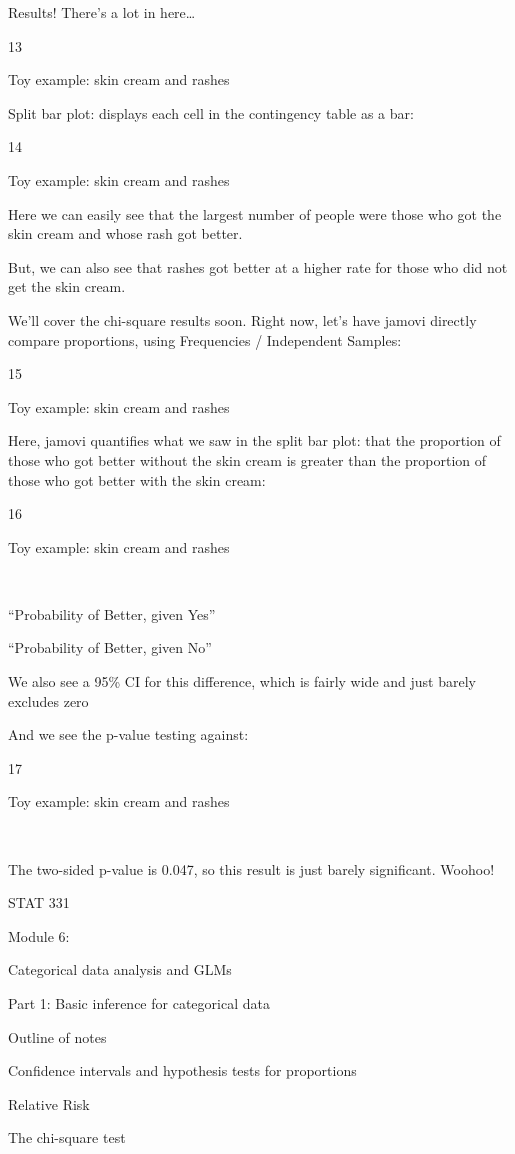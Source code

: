 \documentclass[
  letterpaper,
  DIV=11,
  numbers=noendperiod]{scrreprt}
\begin{document}
Results! There's a lot in here\ldots{}

13

Toy example: skin cream and rashes

Split bar plot: displays each cell in the contingency table as a bar:

14

Toy example: skin cream and rashes

Here we can easily see that the largest number of people were those who
got the skin cream and whose rash got better.

But, we can also see that rashes got better at a higher rate for those
who did not get the skin cream.

We'll cover the chi-square results soon. Right now, let's have jamovi
directly compare proportions, using Frequencies / Independent Samples:

15

Toy example: skin cream and rashes

Here, jamovi quantifies what we saw in the split bar plot: that the
proportion of those who got better without the skin cream is greater
than the proportion of those who got better with the skin cream:

16

Toy example: skin cream and rashes

~

``Probability of Better, given Yes''

``Probability of Better, given No''

We also see a 95\% CI for this difference, which is fairly wide and just
barely excludes zero

And we see the p-value testing against:

17

Toy example: skin cream and rashes

~

The two-sided p-value is 0.047, so this result is just barely
significant. Woohoo!

STAT 331

Module 6:

Categorical data analysis and GLMs

Part 1: Basic inference for categorical data

Outline of notes

Confidence intervals and hypothesis tests for proportions

Relative Risk

The chi-square test
\end{document}
